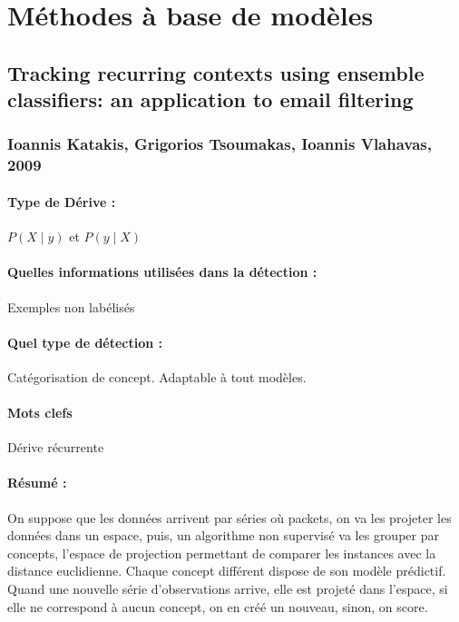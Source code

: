 \documentclass[11pt,a4paper]{report}
\begin{document}
\newpage












\section{Méthodes à base de modèles}
\subsection{Tracking recurring contexts using ensemble classifiers: an application to email filtering}
\subsubsection{Ioannis Katakis, Grigorios Tsoumakas, Ioannis Vlahavas, 2009}

\paragraph{Type de Dérive :} $P(X\mid y)$ et $P(y \mid X)$
\paragraph{Quelles informations utilisées dans la détection :} Exemples non labélisés
\paragraph{Quel type de détection :} Catégorisation de concept. Adaptable à tout modèles.

\paragraph{Mots clefs} Dérive récurrente

\paragraph{Résumé :} On suppose que les données arrivent par séries où packets, on va les projeter les données dans un espace, puis, un algorithme non supervisé va les grouper par concepts, l'espace de projection permettant de comparer les instances avec la distance euclidienne. Chaque concept différent dispose de son modèle prédictif. Quand une nouvelle série d'observations arrive, elle est projeté dans l'espace, si elle ne correspond à aucun concept, on en créé un nouveau, sinon, on score.
\end{document}
